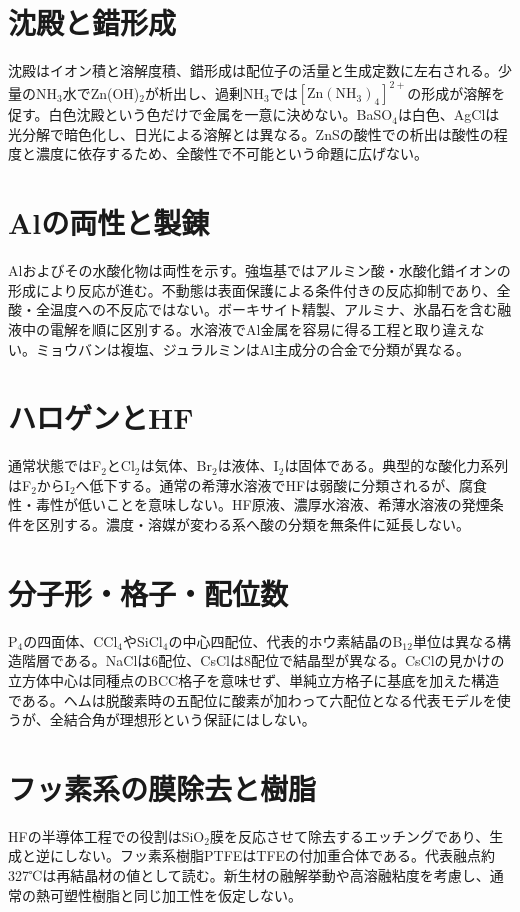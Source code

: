 \section{沈殿と錯形成}\label{theory:inorganic:complex}
沈殿はイオン積と溶解度積、錯形成は配位子の活量と生成定数に左右される。少量のNH$_3$水でZn(OH)$_2$が析出し、過剰NH$_3$では\([\mathrm{Zn(NH_3)_4}]^{2+}\)の形成が溶解を促す。白色沈殿という色だけで金属を一意に決めない。BaSO$_4$は白色、AgClは光分解で暗色化し、日光による溶解とは異なる。ZnSの酸性での析出は酸性の程度と濃度に依存するため、全酸性で不可能という命題に広げない。\cite{inorganic_zinc_ref,qualitative_stanford}
\section{Alの両性と製錬}\label{theory:inorganic:aluminum}
Alおよびその水酸化物は両性を示す。強塩基ではアルミン酸・水酸化錯イオンの形成により反応が進む。不動態は表面保護による条件付きの反応抑制であり、全酸・全温度への不反応ではない。ボーキサイト精製、アルミナ、氷晶石を含む融液中の電解を順に区別する。水溶液でAl金属を容易に得る工程と取り違えない。ミョウバンは複塩、ジュラルミンはAl主成分の合金で分類が異なる。\cite{inorganic_al_ref}
\section{ハロゲンとHF}\label{theory:inorganic:halogen}
通常状態ではF$_2$とCl$_2$は気体、Br$_2$は液体、I$_2$は固体である。典型的な酸化力系列はF$_2$からI$_2$へ低下する。通常の希薄水溶液でHFは弱酸に分類されるが、腐食性・毒性が低いことを意味しない。HF原液、濃厚水溶液、希薄水溶液の発煙条件を区別する。濃度・溶媒が変わる系へ酸の分類を無条件に延長しない。\cite{inorganic_halogen_ref,niosh_hf}
\section{分子形・格子・配位数}\label{theory:inorganic:structure}
P$_4$の四面体、CCl$_4$やSiCl$_4$の中心四配位、代表的ホウ素結晶のB$_{12}$単位は異なる構造階層である。NaClは6配位、CsClは8配位で結晶型が異なる。CsClの見かけの立方体中心は同種点のBCC格子を意味せず、単純立方格子に基底を加えた構造である。ヘムは脱酸素時の五配位に酸素が加わって六配位となる代表モデルを使うが、全結合角が理想形という保証にはしない。\cite{openstax_crystals,inorganic_metalloid_ref,inorganic_heme}
\section{フッ素系の膜除去と樹脂}\label{theory:inorganic:fluorine}
HFの半導体工程での役割はSiO$_2$膜を反応させて除去するエッチングであり、生成と逆にしない。フッ素系樹脂PTFEはTFEの付加重合体である。代表融点約327℃は再結晶材の値として読む。新生材の融解挙動や高溶融粘度を考慮し、通常の熱可塑性樹脂と同じ加工性を仮定しない。\cite{inorganic_hf_etch,inorganic_ptfe}
